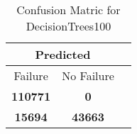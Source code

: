\begin{table}[] 
\caption{Confusion Matric for DecisionTrees100} 
\label{Table: Prediction Accuracy-DMDDecisionTrees100OnlySunEKF-combinationReflectionperfectNoFailurePrediction-Reflection} 
\centering 
\begin{tabular} 
 {@{}ccc@{}} 
\toprule 
\multicolumn{2}{c}{\textbf{Predicted}}
 \\ \midrule 
\multicolumn{1}{|c|}{Failure} & 
\multicolumn{1}{c|}{No Failure}
 \\ \midrule 
\multicolumn{1}{|c|}{\color{green}\textbf{110771}} & 
\multicolumn{1}{c|}{\color{red}\textbf{0}}
 \\ \midrule 
\multicolumn{1}{|c|}{\color{red}\textbf{15694}} & 
\multicolumn{1}{c|}{\color{green}\textbf{43663}}
 \\ \bottomrule 
\end{tabular} 
\end{table} 
